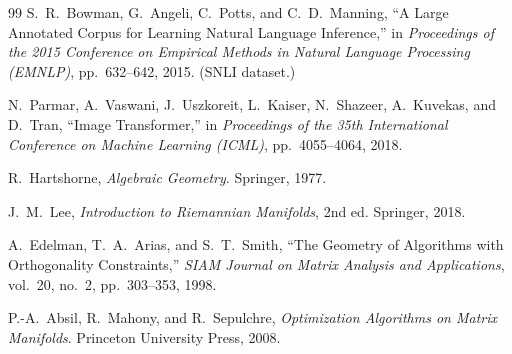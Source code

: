 \documentclass[11pt]{article}
\begin{document}
\begin{thebibliography}{99}
S.~R.~Bowman, G.~Angeli, C.~Potts, and C.~D.~Manning,
``A Large Annotated Corpus for Learning Natural Language Inference,''
in \emph{Proceedings of the 2015 Conference on Empirical Methods in Natural Language Processing (EMNLP)}, pp.~632--642, 2015.
(SNLI dataset.)

N.~Parmar, A.~Vaswani, J.~Uszkoreit, L.~Kaiser, N.~Shazeer, A.~Kuvekas, and D.~Tran,
``Image Transformer,''
in \emph{Proceedings of the 35th International Conference on Machine Learning (ICML)}, pp.~4055--4064, 2018.

R.~Hartshorne,
\emph{Algebraic Geometry}.
Springer, 1977.

J.~M.~Lee,
\emph{Introduction to Riemannian Manifolds}, 2nd ed.
Springer, 2018.

A.~Edelman, T.~A.~Arias, and S.~T.~Smith,
``The Geometry of Algorithms with Orthogonality Constraints,''
\emph{SIAM Journal on Matrix Analysis and Applications}, vol.~20, no.~2, pp.~303--353, 1998.

P.-A.~Absil, R.~Mahony, and R.~Sepulchre,
\emph{Optimization Algorithms on Matrix Manifolds}.
Princeton University Press, 2008.

\end{thebibliography}
\end{document}
